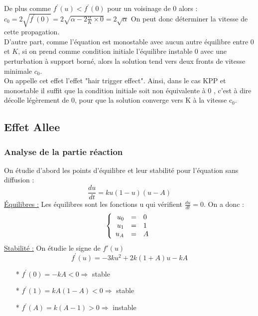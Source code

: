 \documentclass[a4paper,11pt]{article}
\begin{document}
    De plus comme $ f^\prime(u)< f^\prime(0)$ pour un voisinage de $0$ alors : \\
    $c_0=2 \sqrt{f^\prime(0)}= 2 \sqrt{\alpha - 2 \frac{\alpha}{K} \times 0} = 2 \sqrt{\alpha}$
    On peut donc déterminer la vitesse de cette propagation. \\
    
    
        D'autre part, comme l'équation est monostable avec aucun autre équilibre entre $0$ et $K$, si on prend comme condition initiale l'équilibre instable $0$ avec une perturbation à support borné, alors la solution tend vers deux fronts de vitesse minimale $c_0$. \\
		On appelle cet effet l'effet "hair trigger effect". Ainsi, dans le cas KPP et monostable il suffit que
		la condition initiale soit non équivalente à 0 , c'est à dire décolle légèrement de 0, pour que la solution
		converge vers K à la vitesse c$_0$. 
		
		
		
\subsection{Effet Allee}
\subsubsection{Analyse de la partie réaction}
On étudie d'abord les points d'équilibre et leur stabilité pour l'équation sans diffusion : $$\frac{du}{dt}=ku(1-u)(u-A)$$
\underline{Équilibres :} Les équilibres sont les fonctions u qui vérifient $\frac{du}{dt}=0$. On a donc :
\[
\left\{
\begin{array}{r c l}
u_0 &=& 0\\
u_1 &=& 1\\
u_A &=& A\\
\end{array}
\right.
\]
\underline{Stabilité :} On étudie le signe de $f'(u)$ 
$$f^\prime(u)= -3ku^2 + 2k(1+A)u-kA$$

\begin{itemize}
    	\item[*] $f^\prime(0)=-kA <0 \Rightarrow $ stable
        \item[*] $f^\prime(1)=kA(1-A) <0 \Rightarrow $ stable
        \item[*] $f^\prime(A)=k(A-1) >0 \Rightarrow $ instable
	\end{itemize}
\end{document}
